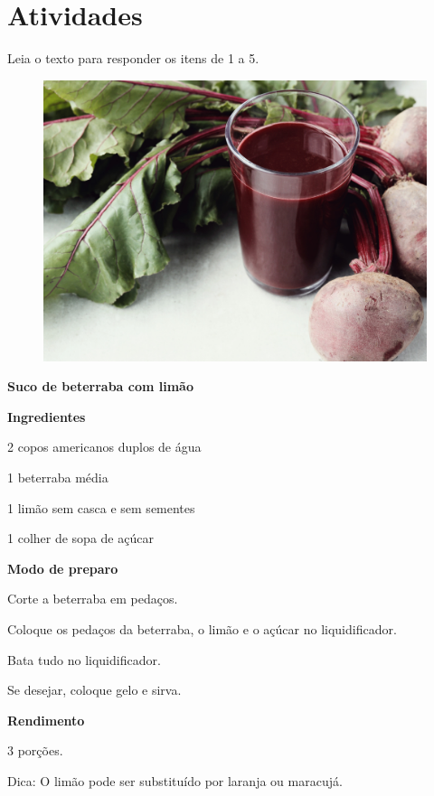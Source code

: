 \section*{Atividades}

Leia o texto para responder os itens de 1 a 5.


\begin{figure}[htpb!]
\centering
\includegraphics[width=.7\textwidth]{media/image10a.jpg}
\end{figure}

\begin{myquote}
\textbf{Suco de beterraba com limão}

\textbf{Ingredientes}

2 copos americanos duplos de água

1 beterraba média

1 limão sem casca e sem sementes

1 colher de sopa de açúcar

\pagebreak
\textbf{Modo de preparo}

Corte a beterraba em pedaços.

Coloque os pedaços da beterraba, o limão e o açúcar no liquidificador.

Bata tudo no liquidificador. 

Se desejar, coloque gelo e sirva.

\textbf{Rendimento}

3 porções.

Dica: O limão pode ser substituído por laranja ou maracujá.

\end{myquote}


